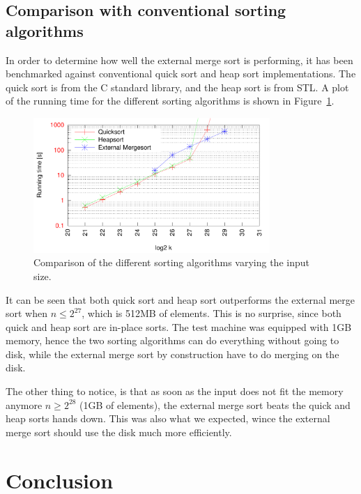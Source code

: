 \documentclass[a4paper,12pt]{article}
\begin{document}
\subsection{Comparison with conventional sorting algorithms}
In order to determine how well the external merge sort is performing,
it has been benchmarked against conventional quick sort and heap sort
implementations. The quick sort is from the C standard library, and
the heap sort is from STL. A plot of the running time for the
different sorting algorithms is shown in Figure~\ref{fig:best-sort}.

\begin{figure}[h!]
  \centering
  \includegraphics[width=0.8\textwidth]{best_sort}
  \caption{Comparison of the different sorting algorithms varying the input size.}
  \label{fig:best-sort}
\end{figure}

It can be seen that both quick sort and heap sort outperforms the
external merge sort when $n \leq 2^{27}$, which is 512MB of
elements. This is no surprise, since both quick and heap sort are
in-place sorts. The test machine was equipped with 1GB memory, hence
the two sorting algorithms can do everything without going to disk,
while the external merge sort by construction have to do merging on
the disk.

The other thing to notice, is that as soon as the input does not fit
the memory anymore $n \geq 2^{28}$ (1GB of elements), the external
merge sort beats the quick and heap sorts hands down. This was also
what we expected, wince the external merge sort should use the disk
much more efficiently.

\section{Conclusion}


\clearpage{}
\end{document}
